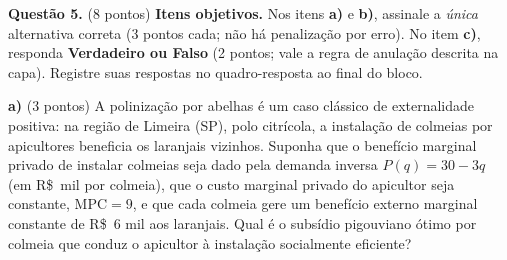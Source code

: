 
\textbf{Questão 5.} (8 pontos) \textbf{Itens objetivos.} Nos itens \textbf{a)} e \textbf{b)}, assinale a \emph{única} alternativa correta (3 pontos cada; não há penalização por erro). No item \textbf{c)}, responda \textbf{Verdadeiro ou Falso} (2 pontos; vale a regra de anulação descrita na capa). Registre suas respostas no quadro-resposta ao final do bloco.

\textbf{a)} (3 pontos) A polinização por abelhas é um caso clássico de externalidade positiva: na região de Limeira (SP), polo citrícola, a instalação de colmeias por apicultores beneficia os laranjais vizinhos. Suponha que o benefício marginal privado de instalar colmeias seja dado pela demanda inversa $P(q)=30-3q$ (em R\$~mil por colmeia), que o custo marginal privado do apicultor seja constante, $\text{MPC}=9$, e que cada colmeia gere um benefício externo marginal constante de R\$~6 mil aos laranjais. Qual é o subsídio pigouviano ótimo por colmeia que conduz o apicultor à instalação socialmente eficiente?

